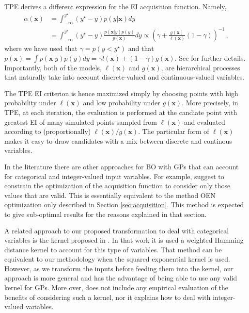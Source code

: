 TPE derives a different expression for the EI acquisition function. Namely,
\begin{align}
\alpha(\mathbf{x}) & = \int_{-\infty}^{y^\star}(y^\star-y)p(y|\mathbf{x})dy  \nonumber \\
	& = \int_{-\infty}^{y^\star}
	(y^\star-y)\frac{p(\mathbf{x}|y)p(y)}{p(\mathbf{x})} dy \propto (\gamma + \frac{g(\mathbf{x})}{\ell(\mathbf{x})}(1-\gamma))^{-1}\,,
\end{align}
where we have used that $\gamma = p(y<y^\star)$ and that $p(\mathbf{x}) = \int p(\mathbf{x}|y)p(y)dy = \gamma l(\mathbf{x}) +
(1-\gamma)g(\mathbf{x})$. See \citep{bergstra2011algorithms} for further details.
Importantly, both of the models, $\ell(\mathbf{x})$ and $g(\mathbf{x})$, are 
hierarchical processes that naturally take into account discrete-valued and continuous-valued variables.

The TPE EI criterion is hence maximized simply by choosing points with high probability 
under $\ell(\mathbf{x})$ and low probability under $g(\mathbf{x})$. 
More precisely, in TPE, at each iteration, the evaluation is performed at the candiate point with greatest EI of many 
simulated points sampled from $\ell(\mathbf{x})$ and evaluated according to (proportionally) $\ell(\mathbf{x}) / g(\mathbf{x})$.
The particular form of $\ell(\mathbf{x})$ makes it easy to draw candidates with a mix between discrete and continous variables.

In the literature there are other approaches for BO with GPs that can account for categorical and 
integer-valued input variables. For example, \citep{rainforth2016bayesian,levesque2017bayesian} suggest to 
constrain the optimization of the acquisition function to consider only those values that are valid. This is 
essentially equivalent to the method OEN optimization only described in Section \ref{sec:acquisition}. This method 
is expected to give sub-optimal results for the reasons explained in that section.

A related approach to our proposed transformation to deal with categorical variables is the kernel proposed 
in \citep{hutter2009automated}. In that work it is used a weighted Hamming distance kernel to account for 
this type of variables. That method can be equivalent to our methodology when the squared exponential kernel is used. 
However, as we transform the inputs before feeding them into the kernel, our approach is more general and has the 
advantage of being able to use any valid kernel for GPs. More over, \citep{hutter2009automated} does not include any 
empirical evaluation of the benefits of considering such a kernel, nor it explains how to deal with integer-valued variables. 


